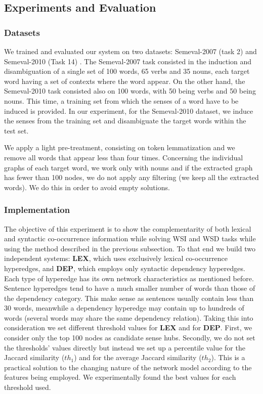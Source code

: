 	
\subsection{Experiments and Evaluation}

\subsubsection{Datasets}
We trained and evaluated our system on two datasets: Semeval-2007 (task 2) \cite{semeval2007task2} and Semeval-2010 (Task 14) \cite{Semeval2010}. The Semeval-2007 task consisted in the induction and disambiguation of a single set of 100 words, 65 verbs and 35 nouns, each target word having a set of contexts where the word appear. On the other hand, the Semeval-2010 task consisted also on 100 words, with 50 being verbs and 50 being nouns. This time, a training set from which the senses of a word have to be induced is provided. In our experiment, for the Semeval-2010 dataset, we induce the senses from the training set and disambiguate the target words within the test set.

We apply a light pre-treatment, consisting on token lemmatization and we remove all words that appear less than four times. Concerning the individual graphs of each target word, we work only with nouns and if the extracted graph has fewer than 100 nodes, we do not apply any filtering (we keep all the extracted words). We do this in order to avoid empty solutions.



\subsubsection{Implementation}
The objective of this experiment is to show the complementarity of both lexical and syntactic co-occurrence information while solving WSI and WSD tasks while using the method described in the previous subsection. To that end we build two independent systems: \textbf{LEX}, which uses exclusively lexical co-occurrence hyperedges, and \textbf{DEP}, which employs only syntactic dependency hyperedges. 
Each type of hyperedge has its own network characteristics as mentioned before. Sentence hyperedges tend to have a much smaller number of words than those of the dependency category. This make sense as sentences usually contain less than 30 words, meanwhile a dependency hyperedge may contain up to hundreds of words (several words may share the same dependency relation). Taking this into consideration we set different threshold values for \textbf{LEX} and for \textbf{DEP}. First, we  consider only the top 100 nodes as candidate sense hubs. Secondly, we do not set the thresholds' values directly but instead we set up a percentile value for the Jaccard similarity ($th_1$) and for the average Jaccard similarity ($th_2$). This is a practical solution to the changing nature of the network model according to the features being employed. We experimentally found the best values for  each threshold used.



